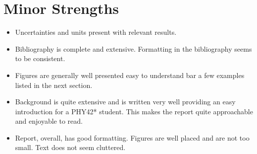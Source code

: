 \documentclass[%
 aip,
cp,  %
 amsmath,amssymb,
 reprint,%
nofootinbib
]{revtex4-2}
\begin{document}
\newpage
\section{Minor Strengths}
\begin{itemize}
    \item Uncertainties and units present with relevant results.
    \item Bibliography is complete and extensive. Formatting in the bibliography seems to be consistent.
    \item Figures are generally well presented easy to understand bar a few examples listed in the next section.
    \item Background is quite extensive and is written very well providing an easy introduction for a PHY42* student. This makes the report quite approachable and enjoyable to read.
    \item Report, overall, has good formatting. Figures are well placed and are not too small. Text does not seem cluttered.
\end{itemize}
\end{document}

